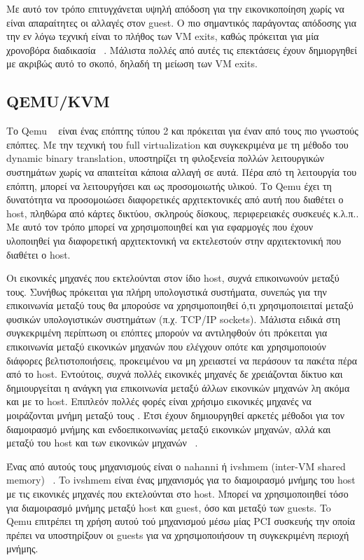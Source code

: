 Με αυτό τον τρόπο επιτυγχάνεται υψηλή απόδοση για την εικονικοποίηση χωρίς να
είναι απαραίτητες οι αλλαγές στον guest. O πιο σημαντικός παράγοντας απόδοσης
για την εν λόγω τεχνική είναι το πλήθος των VM exits, καθώς πρόκειται για μία
χρονοβόρα διαδικασία ~\cite{agesen2012software}. Μάλιστα πολλές από αυτές τις
επεκτάσεις έχουν δημιοργηθεί με ακριβώς αυτό το σκοπό, δηλαδή τη μείωση των VM
exits. 


\subsection{QEMU/KVM}

Το Qemu ~\cite{bellard2005qemu} είναι ένας επόπτης τύπου 2 και πρόκειται για
έναν από τους πιο γνωστούς επόπτες. Με την τεχνική του full virtualization και
συγκεκριμένα με τη μέθοδο του dynamic binary translation, υποστηρίζει τη
φιλοξενεία πολλών λειτουργικών συστημάτων χωρίς να απαιτείται κάποια αλλαγή σε
αυτά. Πέρα από τη λειτουργία του επόπτη, μπορεί να λειτουργήσει και ως
προσομοιωτής υλικού. Το Qemu έχει τη δυνατότητα να προσομοιώσει διαφορετικές
αρχιτεκτονικές από αυτή που διαθέτει ο host, πληθώρα από κάρτες δικτύου,
σκληρούς δίσκους, περιφερειακές συσκευές κ.λ.π.. Mε αυτό τον τρόπο μπορεί να
χρησιμοποιηθεί και για εφαρμογές που έχουν υλοποιηθεί για διαφορετική
αρχιτεκτονική να εκτελεστούν στην αρχιτεκτονική που διαθέτει ο host. 

Οι εικονικές μηχανές που εκτελούνται στον ίδιο host, συχνά επικοινωνούν μεταξύ
τους. Συνήθως πρόκειται για πλήρη υπολογιστικά συστήματα, συνεπώς για την
επικοινωνία μεταξύ τους θα μπορούσε να χρησιμοποιηθεί ό,τι χρησιμοποιειταί
μεταξύ φυσικών υπολογιστικών συστημάτων (π.χ. TCP/IP sockets). Μάλιστα ειδικά
στη συγκεκριμένη περίπτωση οι επόπτες μπορούν να αντιληφθούν ότι πρόκειται για
επικοινωνία μεταξύ εικονικών μηχανών που ελέγχουν οπότε και χρησιμοποιούν
διάφορες βελτιστοποιήσεις, προκειμένου να μη χρειαστεί να περάσουν τα πακέτα
πέρα από το host. Εντούτοις, συχνά πολλές εικονικές μηχανές δε χρειάζονται
δίκτυο και δημιουργείται η ανάγκη για επικοινωνία μεταξύ άλλων εικονικών μηχανών
λη ακόμα και με το host. Επιπλεόν πολλές φορές είναι χρήσιμο εικονικές μηχανές
να μοιράζονται μνήμη μεταξύ τους . Έτσι έχουν δημιουργηθεί αρκετές μέθοδοι για
τον διαμοιρασμό μνήμης και ενδοεπικοινωνίας μεταξύ εικονικών μηχανών, αλλά και
μεταξύ του host και των εικονικών μηχανών ~\cite{ren2016shared}. 

Ένας από αυτούς τους μηχανισμούς είναι ο nahanni ή ivshmem (inter-VM shared
memory) ~\cite{macdonell2011shared}. To ivshmem είναι ένας μηχανισμός για το
διαμοιρασμό μνήμης του host με τις εικονικές μηχανές που εκτελούνται στο host.
Μπορεί να χρησιμοποιηθεί τόσο για διαμοιρασμό μνήμης μεταξύ host και guest, όσο
και μεταξύ των guests. To Qemu επιτρέπει τη χρήση αυτού τού μηχανισμού μέσω
μίας PCI συσκευής την οποία πρέπει να υποστηρίξουν οι guests για να
χρησιμοποιήσουν τη συγκεκριμένη περιοχή μνήμης. 

